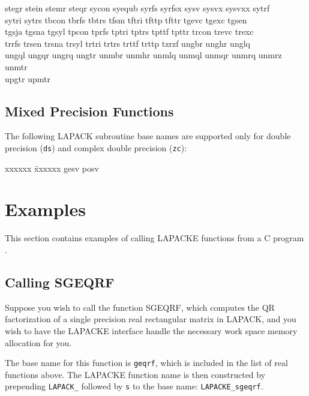 \begin{tabbing}
stegr \>
stein \>
stemr \>
steqr \>
sycon \>
syequb \>
syrfs \>
syrfsx \>
sysv \>
sysvx \>
sysvxx \>
sytrf \\
sytri \>
sytrs \>
tbcon \>
tbrfs \>
tbtrs \>
tfsm \>
tftri \> 
tfttp \>
tfttr \>
tgevc \>
tgexc \>
tgsen \\
tgsja \>
tgsna \>
tgsyl \>
tpcon \>
tprfs \>
tptri \>
tptrs \>
tpttf \>
tpttr \>
trcon \>
trevc \>
trexc \\
trrfs \>
trsen \>
trsna \>
trsyl \>
trtri \> 
trtrs \>
trttf \>
trttp \>
tzrzf \>
ungbr \>
unghr \>
unglq \\
ungql \>
ungqr \>
ungrq \>
ungtr \>
unmbr \>
unmhr \>
unmlq \>
unmql \>
unmqr \>
unmrq \>
unmrz \>
unmtr \\
upgtr \>
upmtr \\
\end{tabbing}

\subsection{Mixed Precision Functions}

The following LAPACK subroutine base names are supported only for double precision ({\tt ds}) and complex double precision ({\tt zc}):

\begin{tabbing}
xxxxxx \=
xxxxxx \kill
gesv \>
posv \\
\end{tabbing}


\section{Examples}

This section contains examples of calling LAPACKE functions from a C program
.

\subsection{Calling SGEQRF}

Suppose you wish to call the function SGEQRF, which computes the QR factorization of a single precision real rectangular matrix in LAPACK, and you wish to have the LAPACKE interface handle the necessary work space memory allocation for you.

The base name for this function is {\tt geqrf}, which is included in the list of real functions above. The LAPACKE function name is then constructed by prepending {\tt LAPACK\_} followed by {\tt s} to the base name: {\tt LAPACKE\_sgeqrf}.

